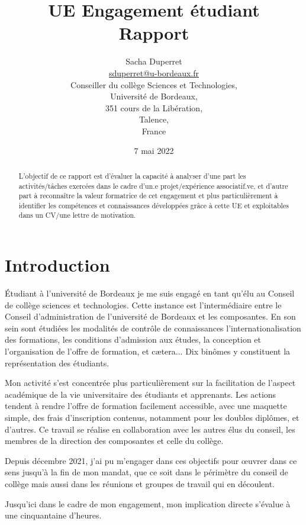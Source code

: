 \documentclass{article}
\title{{\huge UE Engagement étudiant\\Rapport}}
\author{$ $\\{\LARGE Sacha Duperret}\\ $ $\\ \href{mailto:sduperret@u-bordeaux.fr}{sduperret@u-bordeaux.fr}\\Conseiller du collège Sciences et Technologies,\\Université de Bordeaux,\\351 cours de la Libération,\\Talence,\\France}
\date{7 mai 2022}
\begin{document}
\maketitle

\vspace{20pt}

\tableofcontents

\vspace{50pt}

\begin{abstract}
L'objectif de ce rapport est d'évaluer la capacité à analyser d’une part les activités/tâches exercées dans le cadre d'un.e projet/expérience associatif.ve, et d’autre part à reconnaître la valeur formatrice de cet engagement et plus particulièrement à identifier les compétences et connaissances développées grâce à cette UE et exploitables dans un CV/une lettre de motivation.
\end{abstract}

\newpage \section*{Introduction}

Étudiant à l'université de Bordeaux je me suis engagé en tant qu'élu au Conseil de collège sciences et technologies. 
Cette instance est l’intermédiaire entre le Conseil d'administration de l'université de Bordeaux et les composantes. 
En son sein sont étudiées les modalités de contrôle de connaissances l’internationalisation des formations, les conditions d'admission aux études, la conception et l'organisation de l'offre de formation, et cætera... 
Dix binômes y constituent la représentation des étudiants. 

Mon activité s'est concentrée plus particulièrement sur la facilitation de l'aspect académique de la vie universitaire des étudiants et apprenants. Les actions tendent à rendre l’offre de formation facilement accessible, avec une maquette simple, des frais d'inscription contenus, notamment pour les doubles diplômes, et d'autres. Ce travail se réalise en collaboration avec les autres élus du conseil, les membres de la direction des composantes et celle du collège. 

Depuis décembre 2021, j’ai pu m’engager dans ces objectifs pour œuvrer dans ce sens jusqu’à la fin de mon mandat, que ce soit dans le périmètre du conseil de collège mais aussi dans les réunions et groupes de travail qui en découlent. 

\newpage
Jusqu'ici dans le cadre de mon engagement, mon implication directe s’évalue à une cinquantaine d'heures. 
\end{document}
